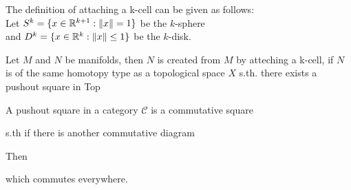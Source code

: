 The definition of attaching a k-cell can be given as follows: \\
Let $S^k = \{x \in {\mathbb R}^{k+1} : \lVert x \rVert = 1\}$ be the $k$-sphere \\
and $D^k = \{ x \in {\mathbb R}^k : \lVert x \rVert \leq 1 \}$ be the $k$-disk.

Let $M$ and $N$ be manifolds, then $N$ is created from $M$ by atteching a 
k-cell, if $N$ is of the same homotopy type as a topological space $X$ s.th. 
there exists a pushout square in Top

\begin{figure}[H]
   \centering
\end{figure}

A pushout square in a category $\mathcal{C}$ is a commutative square 

\begin{figure}[H]
   \centering
\end{figure}      
   
s.th if there is another commutative diagram

\begin{figure}[H]
   \centering
\end{figure}

Then 

\begin{figure}[H]
   \centering
\end{figure}

which commutes everywhere.